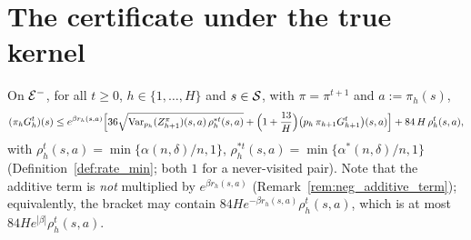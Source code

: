 \section{The certificate under the true kernel}
\label{sec:neg_true_kernel}

\begin{lemma}\label{lem:cert_true_recursion_neg}
\leanok
{}
On $\mathcal{E}^-$, for all $t \ge 0$, $h \in \{1, \dots, H\}$ and $s \in \mathcal{S}$, with $\pi = \pi^{t+1}$ and
$a := \pi_h(s)$,
\[
  (\pi_hG_h^t)(s) \le e^{\beta r_h(s,a)}\Big[
    36\sqrt{\operatorname{Var}_{p_h}(Z^\pi_{h+1})(s,a)\,\rho^{*t}_h(s,a)}
    + \Big(1 + \frac{13}{H}\Big)\big(p_h\,\pi_{h+1}G^t_{h+1}\big)(s,a)\Big]
    + 84\,H\,\rho^t_h(s,a) ,
\]
with $\rho^t_h(s,a) = \min\{\alpha(n,\delta)/n, 1\}$, $\rho^{*t}_h(s,a) = \min\{\alpha^*(n,\delta)/n, 1\}$
(Definition~\ref{def:rate_min}; both $1$ for a never-visited pair). Note that the additive term
is \emph{not} multiplied by $e^{\beta r_h(s,a)}$ (Remark~\ref{rem:neg_additive_term}); equivalently,
the bracket may contain $84He^{-\beta r_h(s,a)}\rho^t_h(s,a)$, which is at most $84He^{|\beta|}\rho^t_h(s,a)$.
\end{lemma}


